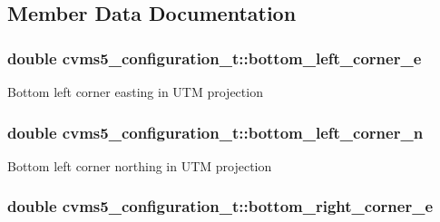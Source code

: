 \subsection{Member Data Documentation}
\hypertarget{structcvms5__configuration__t_a39071d1d92dee66ac048d7391c615fa5}{
\subsubsection[{bottom\+\_\+left\+\_\+corner\+\_\+e}]{\setlength{\rightskip}{0pt plus 5cm}double cvms5\+\_\+configuration\+\_\+t\+::bottom\+\_\+left\+\_\+corner\+\_\+e}}\label{structcvms5__configuration__t_a39071d1d92dee66ac048d7391c615fa5}
Bottom left corner easting in U\+T\+M projection \hypertarget{structcvms5__configuration__t_a7898366bb41ef2badcb9bb2fe97a5c1c}{
\subsubsection[{bottom\+\_\+left\+\_\+corner\+\_\+n}]{\setlength{\rightskip}{0pt plus 5cm}double cvms5\+\_\+configuration\+\_\+t\+::bottom\+\_\+left\+\_\+corner\+\_\+n}}\label{structcvms5__configuration__t_a7898366bb41ef2badcb9bb2fe97a5c1c}
Bottom left corner northing in U\+T\+M projection \hypertarget{structcvms5__configuration__t_a8a98866ca1082991503e8baecd1214d1}{
\subsubsection[{bottom\+\_\+right\+\_\+corner\+\_\+e}]{\setlength{\rightskip}{0pt plus 5cm}double cvms5\+\_\+configuration\+\_\+t\+::bottom\+\_\+right\+\_\+corner\+\_\+e}}\label{structcvms5__configuration__t_a8a98866ca1082991503e8baecd1214d1}
